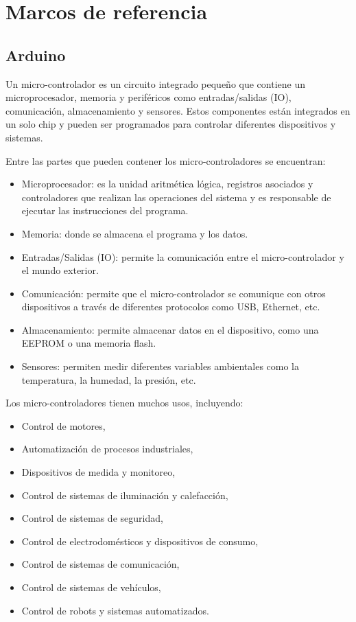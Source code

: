 \chapter{Marcos de referencia}
\label{ApendiceA}
\section{Arduino}

Un micro-controlador es un circuito integrado pequeño que contiene un microprocesador, memoria y periféricos como entradas/salidas (IO), comunicación, almacenamiento y sensores. Estos componentes están integrados en un solo chip y pueden ser programados para controlar diferentes dispositivos y sistemas.

Entre las partes que pueden contener los micro-controladores se encuentran: 

\begin{itemize}
    \item Microprocesador: es la unidad aritmética lógica,  registros asociados y controladores  que realizan  las operaciones del sistema y es responsable de ejecutar las instrucciones del programa.
    \item Memoria: donde se almacena el programa y los datos.
    \item Entradas/Salidas (IO): permite la comunicación entre el micro-controlador y el mundo exterior.
    \item Comunicación: permite que el micro-controlador se comunique con otros dispositivos a través de diferentes protocolos como USB, Ethernet, etc.
    \item Almacenamiento: permite almacenar datos en el dispositivo, como una EEPROM o una memoria flash.
    \item Sensores: permiten medir diferentes variables ambientales como la temperatura, la humedad, la presión, etc.
\end{itemize}

Los micro-controladores tienen muchos usos, incluyendo: 
\begin{itemize}
    \item Control de motores,
    \item Automatización de procesos industriales,
    \item Dispositivos de medida y monitoreo,
    \item Control de sistemas de iluminación y calefacción,
    \item Control de sistemas de seguridad,
    \item Control de electrodomésticos y dispositivos de consumo,
    \item Control de sistemas de comunicación,
    \item Control de sistemas de vehículos,
    \item Control de robots y sistemas automatizados.
\end{itemize}
